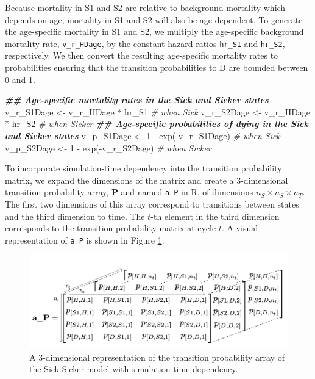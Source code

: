 \documentclass[
]{article}
\newenvironment{Shaded}{\begin{snugshade}}{\end{snugshade}}
\newcommand{\CommentTok}[1]{\textcolor[rgb]{0.56,0.35,0.01}{\textit{#1}}}
\newcommand{\DecValTok}[1]{\textcolor[rgb]{0.00,0.00,0.81}{#1}}
\newcommand{\DocumentationTok}[1]{\textcolor[rgb]{0.56,0.35,0.01}{\textbf{\textit{#1}}}}
\newcommand{\FunctionTok}[1]{\textcolor[rgb]{0.00,0.00,0.00}{#1}}
\newcommand{\NormalTok}[1]{#1}
\newcommand{\OtherTok}[1]{\textcolor[rgb]{0.56,0.35,0.01}{#1}}
\newcommand{\SpecialCharTok}[1]{\textcolor[rgb]{0.00,0.00,0.00}{#1}}
\begin{document}
Because mortality in S1 and S2 are relative to background mortality which depends on age, mortality in S1 and S2 will also be age-dependent. To generate the age-specific mortality in S1 and S2, we multiply the age-specific background mortality rate, \texttt{v\_r\_HDage}, by the constant hazard ratios \texttt{hr\_S1} and \texttt{hr\_S2}, respectively. We then convert the resulting age-specific mortality rates to probabilities ensuring that the transition probabilities to D are bounded between 0 and 1.

\begin{Shaded}
\begin{Highlighting}[]
\DocumentationTok{\#\# Age{-}specific mortality rates in the Sick and Sicker states}
\NormalTok{v\_r\_S1Dage }\OtherTok{\textless{}{-}}\NormalTok{ v\_r\_HDage }\SpecialCharTok{*}\NormalTok{ hr\_S1 }\CommentTok{\# when Sick}
\NormalTok{v\_r\_S2Dage }\OtherTok{\textless{}{-}}\NormalTok{ v\_r\_HDage }\SpecialCharTok{*}\NormalTok{ hr\_S2 }\CommentTok{\# when Sicker}
\DocumentationTok{\#\# Age{-}specific probabilities of dying in the Sick and Sicker states}
\NormalTok{v\_p\_S1Dage }\OtherTok{\textless{}{-}} \DecValTok{1} \SpecialCharTok{{-}} \FunctionTok{exp}\NormalTok{(}\SpecialCharTok{{-}}\NormalTok{v\_r\_S1Dage) }\CommentTok{\# when Sick}
\NormalTok{v\_p\_S2Dage }\OtherTok{\textless{}{-}} \DecValTok{1} \SpecialCharTok{{-}} \FunctionTok{exp}\NormalTok{(}\SpecialCharTok{{-}}\NormalTok{v\_r\_S2Dage) }\CommentTok{\# when Sicker}
\end{Highlighting}
\end{Shaded}

To incorporate simulation-time dependency into the transition probability matrix, we expand the dimensions of the matrix and create a 3-dimensional transition probability array, \(\mathbf{P}\) and named \texttt{a\_P} in R, of dimensions \(n_S \times n_S \times n_T\). The first two dimensions of this array correspond to transitions between states and the third dimension to time. The \(t\)-th element in the third dimension corresponds to the transition probability matrix at cycle \(t\). A visual representation of \texttt{a\_P} is shown in Figure \ref{fig:Array-Time-Dependent}.

\begin{figure}[H]

{\centering \includegraphics[width=1\linewidth]{figs/3D-state-transition-array-sick-sicker-without-tunnels} 

}

\caption{A 3-dimensional representation of the transition probability array of the Sick-Sicker model with simulation-time dependency.}\label{fig:Array-Time-Dependent}
\end{figure}
\end{document}
